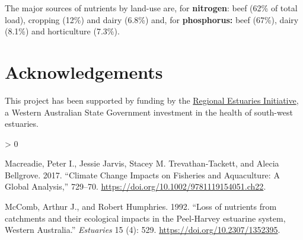 \documentclass[
]{book}
\newlength{\cslhangindent}
\newenvironment{CSLReferences}[2] %
 {%
  \setlength{\parindent}{0pt}
  \ifodd #1 \everypar{\setlength{\hangindent}{\cslhangindent}}\ignorespaces\fi
  \ifnum #2 > 0
  \setlength{\parskip}{#2\baselineskip}
  \fi
 }%
 {}
\begin{document}
The major sources of nutrients by land-use are, for \textbf{nitrogen}: beef (62\% of total load), cropping (12\%) and dairy (6.8\%) and, for \textbf{phosphorus:} beef (67\%), dairy (8.1\%) and horticulture (7.3\%).

\hypertarget{acknowledgements-5}{%
\section{Acknowledgements}\label{acknowledgements-5}}

This project has been supported by funding by the \href{https://rei.dwer.wa.gov.au}{Regional Estuaries Initiative}, a Western Australian State Government investment in the health of south-west estuaries. ~

\backmatter

\hypertarget{refs}{}
\begin{CSLReferences}{1}{0}
\leavevmode\hypertarget{ref-macreadie2017}{}%
Macreadie, Peter I., Jessie Jarvis, Stacey M. Trevathan‐Tackett, and Alecia Bellgrove. 2017. {``{Climate Change Impacts on Fisheries and Aquaculture: A Global Analysis},''} 729--70. \url{https://doi.org/10.1002/9781119154051.ch22}.

\leavevmode\hypertarget{ref-mccomb1992}{}%
McComb, Arthur J., and Robert Humphries. 1992. {``{Loss of nutrients from catchments and their ecological impacts in the Peel-Harvey estuarine system, Western Australia}.''} \emph{Estuaries} 15 (4): 529. \url{https://doi.org/10.2307/1352395}.

\end{CSLReferences}
\end{document}
